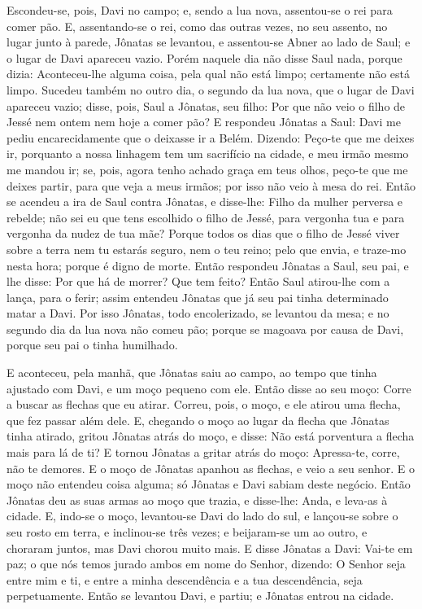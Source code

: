 Escondeu-se, pois, Davi no campo; e, sendo a lua nova,
assentou-se o rei para comer pão. E, assentando-se o rei,
como das outras vezes, no seu assento, no lugar junto à parede,
Jônatas se levantou, e assentou-se Abner ao lado de Saul; e o lugar
de Davi apareceu vazio. Porém naquele dia não disse Saul
nada, porque dizia: Aconteceu-lhe alguma coisa, pela qual não está
limpo; certamente não está limpo. Sucedeu também no outro
dia, o segundo da lua nova, que o lugar de Davi apareceu vazio;
disse, pois, Saul a Jônatas, seu filho: Por que não veio o filho de
Jessé nem ontem nem hoje a comer pão? E respondeu Jônatas a
Saul: Davi me pediu encarecidamente que o deixasse ir a Belém.
Dizendo: Peço-te que me deixes ir, porquanto a nossa linhagem
tem um sacrifício na cidade, e meu irmão mesmo me mandou ir; se,
pois, agora tenho achado graça em teus olhos, peço-te que me deixes
partir, para que veja a meus irmãos; por isso não veio à mesa do
rei. Então se acendeu a ira de Saul contra Jônatas, e
disse-lhe: Filho da mulher perversa e rebelde; não sei eu que tens
escolhido o filho de Jessé, para vergonha tua e para vergonha da
nudez de tua mãe? Porque todos os dias que o filho de Jessé
viver sobre a terra nem tu estarás seguro, nem o teu reino; pelo que
envia, e traze-mo nesta hora; porque é digno de morte. Então
respondeu Jônatas a Saul, seu pai, e lhe disse: Por que há de
morrer? Que tem feito? Então Saul atirou-lhe com a lança,
para o ferir; assim entendeu Jônatas que já seu pai tinha
determinado matar a Davi. Por isso Jônatas, todo
encolerizado, se levantou da mesa; e no segundo dia da lua nova não
comeu pão; porque se magoava por causa de Davi, porque seu pai o
tinha humilhado.

E aconteceu, pela manhã, que Jônatas saiu ao campo, ao tempo que
tinha ajustado com Davi, e um moço pequeno com ele. Então
disse ao seu moço: Corre a buscar as flechas que eu atirar. Correu,
pois, o moço, e ele atirou uma flecha, que fez passar além dele.
E, chegando o moço ao lugar da flecha que Jônatas tinha
atirado, gritou Jônatas atrás do moço, e disse: Não está porventura
a flecha mais para lá de ti? E tornou Jônatas a gritar atrás
do moço: Apressa-te, corre, não te demores. E o moço de Jônatas
apanhou as flechas, e veio a seu senhor. E o moço não
entendeu coisa alguma; só Jônatas e Davi sabiam deste negócio.
Então Jônatas deu as suas armas ao moço que trazia, e
disse-lhe: Anda, e leva-as à cidade. E, indo-se o moço,
levantou-se Davi do lado do sul, e lançou-se sobre o seu rosto em
terra, e inclinou-se três vezes; e beijaram-se um ao outro, e
choraram juntos, mas Davi chorou muito mais. E disse Jônatas
a Davi: Vai-te em paz; o que nós temos jurado ambos em nome do
Senhor, dizendo: O Senhor seja entre mim e ti, e entre a minha
descendência e a tua descendência, seja perpetuamente. Então
se levantou Davi, e partiu; e Jônatas entrou na cidade.

